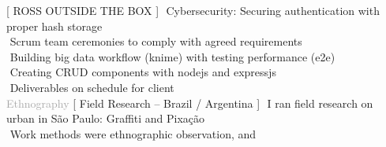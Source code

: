 \begin{cvtable}
\bigskip

%
	{[ R{\scriptsize OSS} O{\scriptsize UTSIDE THE} B{\scriptsize OX} ]}{
        \textperiodcentered $ $ Cybersecurity: Securing authentication with proper hash storage \\
        \textperiodcentered $ $ Scrum team ceremonies to comply with agreed requirements \\        
        \textperiodcentered $ $ Building big data workflow (knime) with testing performance (e2e) \\        
        \textperiodcentered $ $ Creating CRUD components with nodejs and expressjs \\
        \textperiodcentered $ $ Deliverables on schedule for client \\
        }  \smallskip 
%
%
	{%
	\textcolor{darkgray}{%
    Ethnography
	}}
	{
    [ Field Research -- Brazil / Argentina ]%
	}
	{
        \textperiodcentered $ $ I ran field research on urban in São Paulo: Graffiti and Pixação \\ 
        \textperiodcentered $ $ Work methods were ethnographic observation, and %
}
\end{cvtable}
